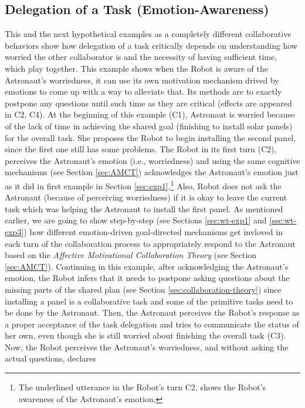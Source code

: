 \subsection{Delegation of a Task (Emotion-Awareness)}
\label{sec:exp3}

This and the next hypothetical examples as a completely different collaborative
behaviors show how delegation of a task critically depends on understanding how
worried the other collaborator is and the necessity of having sufficient time,
which play together. This example shows when the Robot is aware of the
Astronaut's worriedness, it can use its own motivation mechanism drived by
emotions to come up with a way to alleviate that. Its methods are to exactly
postpone any questions until such time as they are critical (effects are
appeared in C2, C4). At the beginning of this example (C1), Astronaut is worried
because of the lack of time in achieving the shared goal (finishing to install
solar panels) for the overall task. She proposes the Robot to begin installing
the second panel, since the first one still has some problems. The Robot in its
first turn (C2), perceives the Astronaut's emotion (i.e., worriedness) and using
the same cognitive mechanisms (see Section \ref{sec:AMCT}) acknowledges the
Astronaut's emotion just as it did in first example in Section
\ref{sec:exp1}.\footnote{The underlined utterance in the Robot's turn C2, shows
the Robot's awareness of the Astronaut's emotion.} Also, Robot does not ask the
Astronaut (because of perceiving worriedness) if it is okay to leave the current
task which was helping the Astronaut to install the first panel. As mentioned
earlier, we are going to show step-by-step (see Sections \ref{sec:wt-exp1} and
\ref{sec:wt-exp3}) how different emotion-driven goal-directed mechanisms get
invloved in each turn of the collaboration process to appropriately respond to
the Astronaut based on the \textit{Affective Motivational Collaboration Theory}
(see Section \ref{sec:AMCT}). Continuing in this example, after acknowledging
the Astronaut's emotion, the Robot infers that it needs to postpone asking
questions about the missing parts of the shared plan (see Section
\ref{sec:collaboration-theory}) since installing a panel is a collaborative task
and some of the primitive tasks need to be done by the Astronaut. Then, the
Astronaut perceives the Robot's response as a proper acceptance of the task
delegation and tries to communicate the status of her own, even though she is
still worried about finishing the overall task (C3). Now, the Robot perceives
the Astronaut's worriedness, and without asking the actual questions, declares
